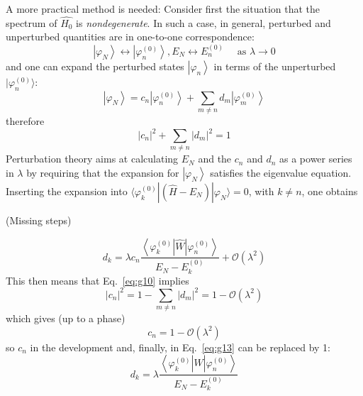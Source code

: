 \documentclass[12pt]{article}
\newcommand{\be}{\begin{equation}}
\newcommand{\ee}{\end{equation}}
\begin{document}
A more practical method is needed:
Consider first the situation that the spectrum of
$\hat{H_{0}}$ is \emph{nondegenerate}.
In such a case, in general, perturbed and unperturbed
quantities are in one-to-one correspondence:
\be
\left|\varphi_{N}\right\rangle \leftrightarrow\left|\varphi_{n}^{(0)}\right\rangle, E_{N} \leftrightarrow E_{n}^{(0)} \quad \text{ as }\lambda \rightarrow 0
\ee
and one can expand the perturbed states $\left|\varphi_{n}\right\rangle$
in terms of the unperturbed $|\varphi_{n}^{(0)}\rangle$:
\be
\left|\varphi_{N}\right\rangle=c_{n}\left|\varphi_{n}^{(0)}\right\rangle
+
\sum_{m \neq n} d_{m}\left|\varphi_{m}^{(0)}\right\rangle
\label{eq:g9}
\ee
therefore
\be
\left|c_{n}\right|^{2}+\sum_{m \neq n}\left|d_{m}\right|^{2}=1
\label{eq:g10}
\ee
Perturbation theory aims at calculating $E_{N}$ and the
$c_n$ and $d_n$ as a power series in $\lambda$ by requiring
that the expansion for $\left|\varphi_{N}\right\rangle$ satisfies the
eigenvalue equation.
Inserting the expansion into $\langle\varphi_{k}^{(0)}|(\hat{H}-E_{N})|\varphi_{N}\rangle=0$,
with $k\neq n$, one obtains

(Missing steps)
\setcounter{equation}{12}

\be
d_{k} =\lambda c_{n} \frac{\left\langle\varphi_{k}^{(0)}|\hat{W}| \varphi_{n}^{(0)}\right\rangle}{E_{N}-E_{k}^{(0)}}+\mathcal{O}\left(\lambda^{2}\right)
\label{eq:g13}
\ee
This then means that Eq.~\eqref{eq:g10} implies
\be
\left|c_{n}\right|^{2}=1-\sum_{m \neq n}\left|d_{m}\right|^{2}=1-\mathcal{O}\left(\lambda^{2}\right)
\ee
which gives (up to a phase)
\be
c_{n}=1-\mathcal{O}\left(\lambda^{2}\right)
\ee
so $c_n$ in the development and, finally, in Eq.~\eqref{eq:g13} can be replaced by 1:
\be
d_{k}=\lambda \frac{\left\langle\varphi_{k}^{(0)}|\hat{W}| \varphi_{n}^{(0)}\right\rangle}{E_{N}-E_{k}^{(0)}}
\ee
\end{document}
